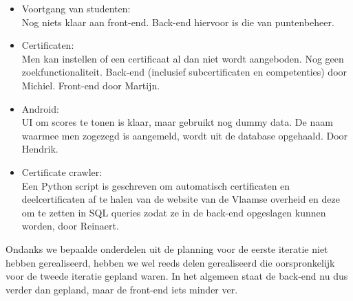 \documentclass[a4paper]{article}
\begin{document}
\begin{itemize}
    \item Voortgang van studenten:\\
    Nog niets klaar aan front-end. Back-end hiervoor is die van puntenbeheer.
    
    \item Certificaten:\\
    Men kan instellen of een certificaat al dan niet wordt aangeboden. Nog geen zoekfunctionaliteit. Back-end (inclusief subcertificaten en competenties) door Michiel. Front-end door Martijn.
    
    \item Android:\\
    UI om scores te tonen is klaar, maar gebruikt nog dummy data. De naam waarmee men zogezegd is aangemeld, wordt uit de database opgehaald. Door Hendrik.
    
    \newpage
    \item Certificate crawler:\\
    Een Python script is geschreven om automatisch certificaten en deelcertificaten af te halen van de website van de Vlaamse overheid en deze om te zetten in SQL queries zodat ze in de back-end opgeslagen kunnen worden, door Reinaert.
\end{itemize}

Ondanks we bepaalde onderdelen uit de planning voor de eerste iteratie niet hebben gerealiseerd, hebben we wel reeds delen gerealiseerd die oorspronkelijk voor de tweede iteratie gepland waren. In het algemeen staat de back-end nu dus verder dan gepland, maar de front-end iets minder ver.
\end{document}

